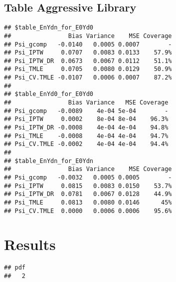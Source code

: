 \documentclass[11pt]{article}\usepackage[]{graphicx}\usepackage[]{color}
\makeatletter
\newenvironment{kframe}{%
 \def\at@end@of@kframe{}%
 \ifinner\ifhmode%
  \def\at@end@of@kframe{\end{minipage}}%
  \begin{minipage}{\columnwidth}%
 \fi\fi%
 \def\FrameCommand##1{\hskip\@totalleftmargin \hskip-\fboxsep
 \colorbox{shadecolor}{##1}\hskip-\fboxsep
     \hskip-\linewidth \hskip-\@totalleftmargin \hskip\columnwidth}%
 \MakeFramed {\advance\hsize-\width
   \@totalleftmargin\z@ \linewidth\hsize
   \@setminipage}}%
 {\par\unskip\endMakeFramed%
 \at@end@of@kframe}
\newenvironment{knitrout}{}{} %
\makeatother
\begin{document}
\subsection{Table Aggressive Library}
\begin{knitrout}
\color{fgcolor}\begin{kframe}
\begin{verbatim}
## $table_EnYdn_for_E0Yd0
##                Bias Variance    MSE Coverage
## Psi_gcomp   -0.0140   0.0005 0.0007        -
## Psi_IPTW     0.0707   0.0083 0.0133    57.9%
## Psi_IPTW_DR  0.0673   0.0067 0.0112    51.1%
## Psi_TMLE     0.0705   0.0080 0.0129    50.9%
## Psi_CV.TMLE -0.0107   0.0006 0.0007    87.2%
## 
## $table_EnYd0_for_E0Yd0
##                Bias Variance   MSE Coverage
## Psi_gcomp   -0.0089    4e-04 5e-04        -
## Psi_IPTW     0.0002    8e-04 8e-04    96.3%
## Psi_IPTW_DR -0.0008    4e-04 4e-04    94.8%
## Psi_TMLE    -0.0008    4e-04 4e-04    94.7%
## Psi_CV.TMLE -0.0002    4e-04 4e-04    94.4%
## 
## $table_EnYdn_for_E0Ydn
##                Bias Variance    MSE Coverage
## Psi_gcomp   -0.0032   0.0005 0.0005        -
## Psi_IPTW     0.0815   0.0083 0.0150    53.7%
## Psi_IPTW_DR  0.0781   0.0067 0.0128    44.9%
## Psi_TMLE     0.0813   0.0080 0.0146      45%
## Psi_CV.TMLE  0.0000   0.0006 0.0006    95.6%
\end{verbatim}
\end{kframe}
\end{knitrout}



\section{Results}
\begin{knitrout}
\color{fgcolor}\begin{kframe}
\begin{verbatim}
## pdf 
##   2
\end{verbatim}
\end{kframe}
\end{knitrout}
\end{document}
